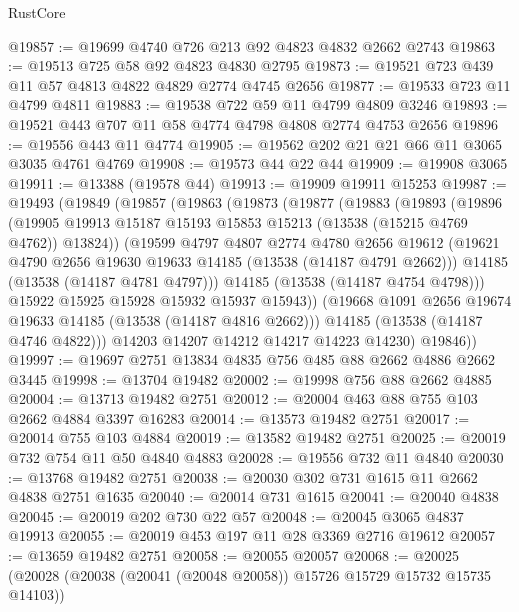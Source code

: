 \begin{lexlean}{RustCore}
\begin{coremodule}
@19857 := @19699 @4740 @726 @213 @92 @4823 @4832 @2662 @2743
@19863 := @19513 @725 @58 @92 @4823 @4830 @2795
@19873 := @19521 @723 @439 @11 @57 @4813 @4822 @4829 @2774 @4745 @2656
@19877 := @19533 @723 @11 @4799 @4811
@19883 := @19538 @722 @59 @11 @4799 @4809 @3246
@19893 := @19521 @443 @707 @11 @58 @4774 @4798 @4808 @2774 @4753 @2656
@19896 := @19556 @443 @11 @4774
@19905 := @19562 @202 @21 @21 @66 @11 @3065 @3035 @4761 @4769
@19908 := @19573 @44 @22 @44
@19909 := @19908 @3065
@19911 := @13388 (@19578 @44)
@19913 := @19909 @19911 @15253
@19987 := @19493
    (@19849
      (@19857
        (@19863
          (@19873
            (@19877
              (@19883
                (@19893
                  (@19896
                    (@19905
                      @19913
                      @15187
                      @15193
                      @15853
                      @15213
                      (@13538 (@15215 @4769 @4762))
                      @13824))
                  (@19599
                    @4797
                    @4807
                    @2774
                    @4780
                    @2656
                    @19612
                    (@19621 @4790 @2656 @19630 @19633 @14185 (@13538 (@14187 @4791 @2662)))
                    @14185
                    (@13538 (@14187 @4781 @4797)))
                  @14185
                  (@13538 (@14187 @4754 @4798)))
                @15922
                @15925
                @15928
                @15932
                @15937
                @15943))
            (@19668 @1091 @2656 @19674 @19633 @14185 (@13538 (@14187 @4816 @2662)))
            @14185
            (@13538 (@14187 @4746 @4822)))
          @14203
          @14207
          @14212
          @14217
          @14223
          @14230)
        @19846))
@19997 := @19697 @2751 @13834 @4835 @756 @485 @88 @2662 @4886 @2662 @3445
@19998 := @13704 @19482
@20002 := @19998 @756 @88 @2662 @4885
@20004 := @13713 @19482 @2751
@20012 := @20004 @463 @88 @755 @103 @2662 @4884 @3397 @16283
@20014 := @13573 @19482 @2751
@20017 := @20014 @755 @103 @4884
@20019 := @13582 @19482 @2751
@20025 := @20019 @732 @754 @11 @50 @4840 @4883
@20028 := @19556 @732 @11 @4840
@20030 := @13768 @19482 @2751
@20038 := @20030 @302 @731 @1615 @11 @2662 @4838 @2751 @1635
@20040 := @20014 @731 @1615
@20041 := @20040 @4838
@20045 := @20019 @202 @730 @22 @57
@20048 := @20045 @3065 @4837 @19913
@20055 := @20019 @453 @197 @11 @28 @3369 @2716 @19612
@20057 := @13659 @19482 @2751
@20058 := @20055 @20057
@20068 := @20025 (@20028 (@20038 (@20041 (@20048 @20058)) @15726 @15729 @15732 @15735 @14103))

\end{coremodule}
\end{lexlean}
